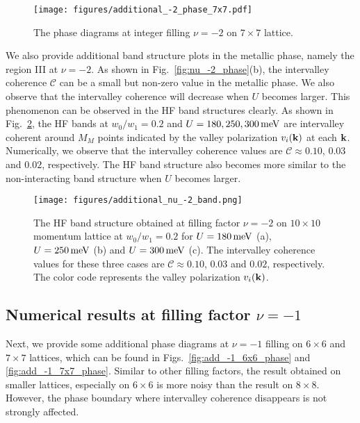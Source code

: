 \documentclass[prb,aps,nofootinbib,amssymb,twocolumn,superscriptaddress,10pt]{revtex4-2}
\begin{document}
\begin{widetext}
\begin{figure}
    \centering
    \texttt{[image: figures/additional\_-2\_phase\_7x7.pdf]}
    \caption{The phase diagrams at integer filling $\nu=-2$ on $7\times 7$ lattice.}
    \label{fig:add_-2_7x7}
\end{figure}

We also provide additional band structure plots in the metallic phase, namely the region III at $\nu=-2$. As shown in Fig.~\ref{fig:nu_-2_phase}(b), the intervalley coherence $\mathcal{C}$ can be a small but non-zero value in the metallic phase. We also observe that the intervalley coherence will decrease when $U$ becomes larger. This phenomenon can be observed in the HF band structures clearly. As shown in Fig.~\ref{fig:add_-2_band}, the HF bands at $w_0/w_1 = 0.2$ and $U = 180, 250, 300\,\rm meV$ are intervalley coherent around $M_M$ points indicated by the valley polarization $v_i(\mathbf{k})$ at each $\mathbf{k}$. Numerically, we observe that the intervalley coherence values are $\mathcal{C} \approx 0.10$, $0.03$ and $0.02$, respectively. The HF band structure also becomes more similar to the non-interacting band structure when $U$ becomes larger.

\begin{figure}
	\centering
	\texttt{[image: figures/additional\_nu\_-2\_band.png]}
	\caption{The HF band structure obtained at filling factor $\nu=-2$ on $10\times 10$ momentum lattice at $w_0/w_1 = 0.2$ for $U = 180\,\rm meV$ (a), $U=250\,\rm meV$ (b) and $U = 300\,\rm meV$ (c). The intervalley coherence values for these three cases are $\mathcal{C} \approx 0.10$, $0.03$ and $0.02$, respectively. The color code represents the valley polarization $v_i(\mathbf{k})$.}
	\label{fig:add_-2_band}
\end{figure}

\subsection{Numerical results at filling factor \texorpdfstring{$\nu=-1$}{nu=-1}}

Next, we provide some additional phase diagrams at $\nu=-1$ filling on $6\times 6$ and $7\times 7$ lattices, which can be found in Figs.~\ref{fig:add_-1_6x6_phase} and \ref{fig:add_-1_7x7_phase}. Similar to other filling factors, the result obtained on smaller lattices, especially on $6\times 6$ is more noisy than the result on $8\times 8$. However, the phase boundary where intervalley coherence disappears is not strongly affected.


\end{widetext}
\end{document}
